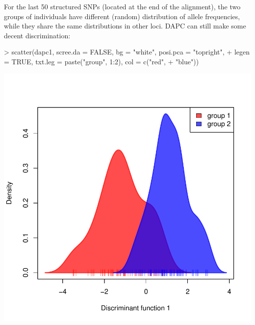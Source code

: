 \documentclass{article}
\begin{document}
For the last 50 structured SNPs (located at the end of the alignment), the two groups of individuals have different (random) distribution of
allele frequencies, while they share the same distributions in other loci.
DAPC can still make some decent discrimination:
\begin{Schunk}
\begin{Sinput}
> scatter(dapc1, scree.da = FALSE, bg = "white", posi.pca = "topright", 
+     legen = TRUE, txt.leg = paste("group", 1:2), col = c("red", 
+         "blue"))
\end{Sinput}
\end{Schunk}
\includegraphics{figs/genomics-062}
\end{document}
